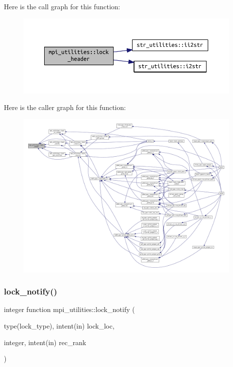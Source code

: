 Here is the call graph for this function\+:\nopagebreak
\begin{figure}[H]
\begin{center}
\leavevmode
\includegraphics[width=350pt]{namespacempi__utilities_abe5bf3ae3b6a06eda18c2f4d62ac09c5_cgraph}
\end{center}
\end{figure}
Here is the caller graph for this function\+:\nopagebreak
\begin{figure}[H]
\begin{center}
\leavevmode
\includegraphics[width=350pt]{namespacempi__utilities_abe5bf3ae3b6a06eda18c2f4d62ac09c5_icgraph}
\end{center}
\end{figure}
\mbox{\label{namespacempi__utilities_a263a30c79639d97f5faffdb566b5a811}} 
\subsubsection{\texorpdfstring{lock\+\_\+notify()}{lock\_notify()}}
{\footnotesize\ttfamily integer function mpi\+\_\+utilities\+::lock\+\_\+notify (\begin{DoxyParamCaption}\item[{type(lock\+\_\+type), intent(in)}]{lock\+\_\+loc,  }\item[{integer, intent(in)}]{rec\+\_\+rank }\end{DoxyParamCaption})}



